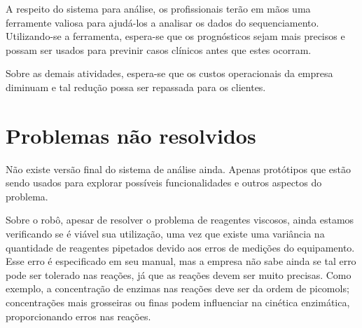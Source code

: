 A respeito do sistema para análise, os profissionais terão em mãos uma ferramente valiosa para ajudá-los a analisar os dados
do sequenciamento. Utilizando-se a ferramenta, espera-se que os prognósticos sejam mais precisos e possam ser usados para
previnir casos clínicos antes que estes ocorram.

Sobre as demais atividades, espera-se que os custos operacionais da empresa diminuam e tal redução possa ser repassada para os clientes.





\section{Problemas não resolvidos}

Não existe versão final do sistema de análise ainda. Apenas protótipos que estão sendo usados para explorar possíveis funcionalidades e outros aspectos do problema.

Sobre o robô, apesar de resolver o problema de reagentes viscosos, ainda estamos verificando se é viável sua utilização, uma vez que
existe uma variância na quantidade de reagentes pipetados devido aos erros de medições do equipamento. Esse erro é especificado em seu manual,
mas a empresa não sabe ainda se tal erro pode ser tolerado nas reações, já que as reações devem ser muito precisas. Como exemplo, a concentração de enzimas
nas reações deve ser da ordem de picomols; concentrações mais grosseiras ou finas podem influenciar na cinética enzimática, proporcionando erros nas reações.

